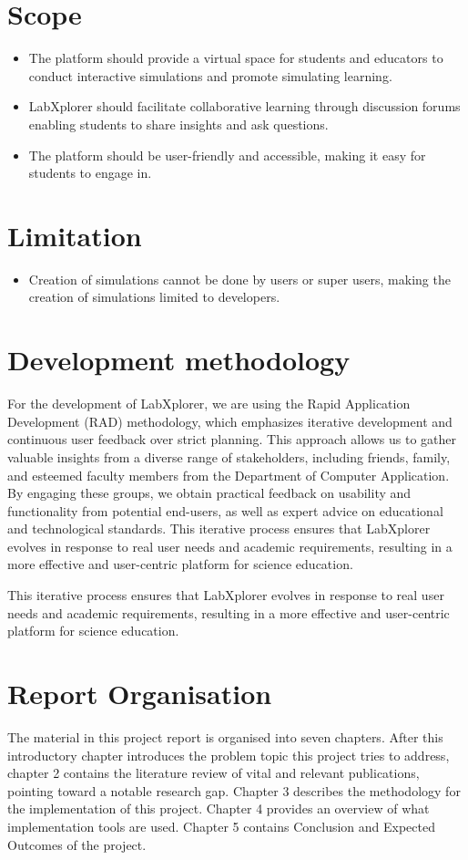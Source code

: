 \section{Scope}

\begin{itemize}
    \item The platform should provide a virtual space for students and educators to conduct interactive simulations and promote simulating learning.
    \item LabXplorer should facilitate collaborative learning through discussion forums enabling students to share insights and ask questions.
    \item The platform should be user-friendly and accessible, making it easy for students to engage in.
    
\end{itemize}
\section{Limitation}

\begin{itemize}
    \item Creation of simulations cannot be done by users or super users, making the creation of simulations limited to developers.
    
    
\end{itemize}
\section{Development methodology}
For the development of LabXplorer, we are using the Rapid Application Development (RAD) methodology, which emphasizes iterative development and continuous user feedback over strict planning. This approach allows us to gather valuable insights from a diverse range of stakeholders, including friends, family, and esteemed faculty members from the Department of Computer Application. By engaging these groups, we obtain practical feedback on usability and functionality from potential end-users, as well as expert advice on educational and technological standards. This iterative process ensures that LabXplorer evolves in response to real user needs and academic requirements, resulting in a more effective and user-centric platform for science education.

This iterative process ensures that LabXplorer evolves in response to real user needs and academic requirements, resulting in a more effective and user-centric platform for science education.
\section{Report Organisation}
The material in this project report is organised into seven chapters. After this introductory chapter introduces the problem topic this project tries to address, chapter 2 contains the literature review of vital and relevant publications, pointing toward a notable research gap. Chapter 3 describes the methodology for the implementation of this project. Chapter 4 provides an overview of what implementation tools are used. Chapter 5 contains Conclusion and Expected Outcomes of the project.